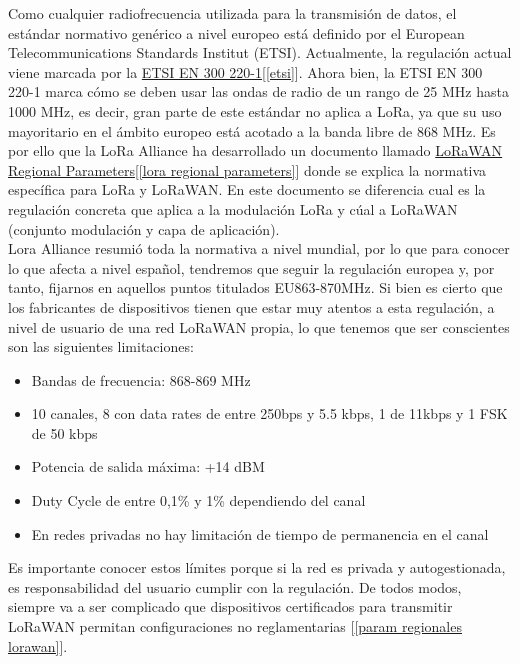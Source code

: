 \documentclass[12pt]{article}
\begin{document}
	\noindent Como cualquier radiofrecuencia utilizada para la transmisión de datos, el estándar normativo genérico a nivel europeo está definido por el European Telecommunications Standards Institut (ETSI). Actualmente, la regulación actual viene marcada por la \href{https://www.etsi.org/deliver/etsi_en/300200_300299/30022001/03.01.01_60/en_30022001v030101p.pdf}{ETSI EN 300 220-1}[\ref{etsi}]. Ahora bien, la ETSI EN 300 220-1 marca cómo se deben usar las ondas de radio de un rango de 25 MHz hasta 1000 MHz, es decir, gran parte de este estándar no aplica a LoRa, ya que su uso mayoritario en el ámbito europeo está acotado a la banda libre de 868 MHz. Es por ello que la LoRa Alliance ha desarrollado un documento llamado \href{https://lora-alliance.org/resource_hub/rp2-1-0-3-lorawan-regional-parameters/}{LoRaWAN Regional Parameters}[\ref{lora regional parameters}] donde se explica la normativa específica para LoRa y LoRaWAN. En este documento se diferencia cual es la regulación concreta que aplica a la modulación LoRa y cúal a LoRaWAN (conjunto modulación y capa de aplicación).\\
	
	\noindent Lora Alliance resumió toda la normativa a nivel mundial, por lo que para conocer lo que afecta a nivel español, tendremos que seguir la regulación europea y, por tanto, fijarnos en aquellos puntos titulados EU863-870MHz. Si bien es cierto que los fabricantes de dispositivos tienen que estar muy atentos a esta regulación, a nivel de usuario de una red LoRaWAN propia, lo que tenemos que ser conscientes son las siguientes limitaciones:
	
	\begin{itemize}
		\item Bandas de frecuencia: 868-869 MHz
		\item 10 canales, 8 con data rates de entre 250bps y 5.5 kbps, 1 de 11kbps y 1 FSK de 50 kbps
		\item Potencia de salida máxima: +14 dBM
		\item Duty Cycle de entre 0,1\% y 1\% dependiendo del canal
		\item En redes privadas no hay limitación de tiempo de permanencia en el canal
	\end{itemize}
	
	\noindent Es importante conocer estos límites porque si la red es privada y autogestionada, es responsabilidad del usuario cumplir con la regulación. De todos modos, siempre va a ser complicado que dispositivos certificados para transmitir LoRaWAN permitan configuraciones no reglamentarias [\ref{param regionales lorawan}].\\
	
\end{document}
